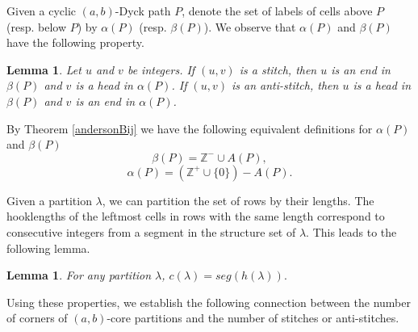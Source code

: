 \documentclass[a4paper,12pt]{article}
\def\proof{\noindent {\it{Proof.} \hskip 2pt}}
\def \remark {\noindent \emph{Remark. }}
\newtheorem{lem}[thm]{Lemma}
\newcommand{\qed}{{\hfill\rule{4pt}{7pt}}}
\begin{document}
Given a cyclic $(a,b)$-Dyck path $P$, denote the set of labels of cells above $P$ (resp. below $P$) by $\alpha(P)$ (resp. $\beta(P)$).
We observe that $\alpha(P)$ and $\beta(P)$ have the following property.

\begin{lem} \label{stitchAndHead}
Let $u$ and $v$ be integers.
If $(u,v)$ is a stitch, then $u$ is an end in $\beta(P)$ and $v$ is a head in $\alpha(P)$.
If $(u,v)$ is an anti-stitch, then $u$ is a head in $\beta(P)$ and $v$ is an end in $\alpha(P)$.
\end{lem}



By Theorem  \ref{andersonBij} we have the following equivalent definitions for $\alpha(P)$ and $\beta(P)$
\begin{equation}\label{a1}
 \beta(P)=  \mathbb{Z}^{-} \cup A(P),
 \end{equation}
\begin{equation}\label{b1}
 \alpha(P)=(\mathbb{Z}^+ \cup \{0\} )- A(P).\end{equation}


Given a partition $\lambda$, we can partition the set of rows by their lengths. The hooklengths of the leftmost cells in rows with the same length correspond to consecutive integers from a segment in the structure set of $\lambda$. This leads to the following lemma.

\begin{lem}  \label{ch}
For any partition $\lambda$,
$ c(\lambda)=seg( h(\lambda) ) .$
\end{lem}



Using these properties, we establish the following connection between the number of  corners of $(a,b)$-core partitions and the number of stitches or anti-stitches.


%
%
%
%
%
%
\end{document}

